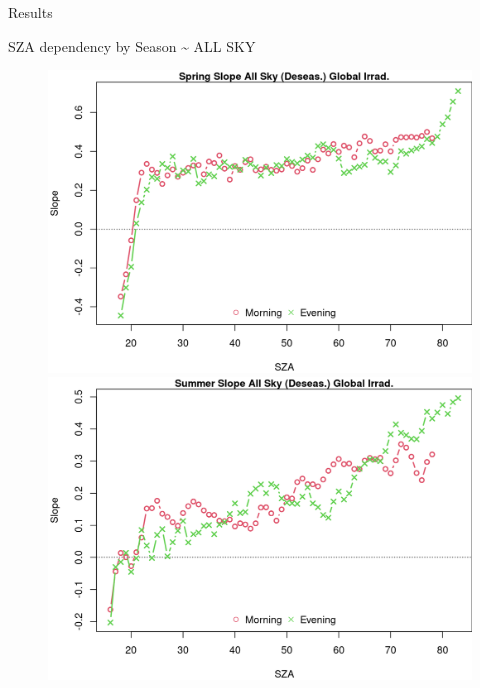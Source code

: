 \documentclass[
  ignorenonframetext,
]{beamer}
\begin{document}
\begin{frame}{Results}
\begin{block}{SZA dependency by Season \textasciitilde{} ALL SKY}
\begin{figure}
\begin{minipage}[t]{0.50\linewidth}
{}

\end{minipage}%
%
\begin{minipage}[t]{0.50\linewidth}

{\centering 

\includegraphics[width=4.48in,height=\textheight]{images/DHI_GHI_2_sza_trends_files/figure-html/szatrendsseas-36.png}

}

\end{minipage}%
\newline
\begin{minipage}[t]{0.50\linewidth}

{\centering 

\includegraphics[width=4.48in,height=\textheight]{images/DHI_GHI_2_sza_trends_files/figure-html/szatrendsseas-66.png}

}

\end{minipage}%
%
\begin{minipage}[t]{0.50\linewidth}


\end{minipage}
\end{figure}
\end{block}
\end{frame}
\end{document}
